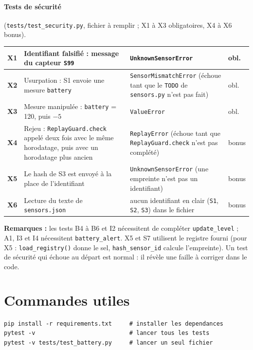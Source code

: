 \documentclass[11pt,a4paper]{article}
\begin{document}
\paragraph{Tests de sécurité} (\texttt{tests/test\_security.py}, fichier à remplir ; X1 à X3 obligatoires, X4 à X6 bonus).
\begin{center}
\begin{tabularx}{\textwidth}{|>{\bfseries}p{0.8cm}|X|X|p{1cm}|}
\hline
X1 & Identifiant falsifié : message du capteur \texttt{S99} & \texttt{UnknownSensorError} & obl.\\\hline
X2 & Usurpation : S1 envoie une mesure \texttt{battery} & \texttt{SensorMismatchError} (échoue tant que le \texttt{TODO} de \texttt{sensors.py} n'est pas fait) & obl.\\\hline
X3 & Mesure manipulée : \texttt{battery} = 120, puis $-5$ & \texttt{ValueError} & obl.\\\hline
X4 & Rejeu : \texttt{ReplayGuard.check} appelé deux fois avec le même horodatage, puis avec un horodatage plus ancien & \texttt{ReplayError} (échoue tant que \texttt{ReplayGuard.check} n'est pas complété) & bonus\\\hline
X5 & Le hash de S3 est envoyé à la place de l'identifiant & \texttt{UnknownSensorError} (une empreinte n'est pas un identifiant) & bonus\\\hline
X6 & Lecture du texte de \texttt{sensors.json} & aucun identifiant en clair (\texttt{S1}, \texttt{S2}, \texttt{S3}) dans le fichier & bonus\\\hline
\end{tabularx}
\end{center}
\normalsize

\textbf{Remarques :}
les tests B4 à B6 et I2 nécessitent de compléter \texttt{update\_level} ; A1, I3 et I4 nécessitent
\texttt{battery\_alert}. X5 et S7 utilisent le registre fourni (pour X5 : \texttt{load\_registry()} donne le sel, \texttt{hash\_sensor\_id} calcule l'empreinte). Un test de sécurité qui échoue au départ est normal : il révèle
une faille à corriger dans le code.

\section{Commandes utiles}

\begin{lstlisting}[style=project]
pip install -r requirements.txt     # installer les dependances
pytest -v                           # lancer tous les tests
pytest -v tests/test_battery.py     # lancer un seul fichier
\end{lstlisting}
\end{document}
